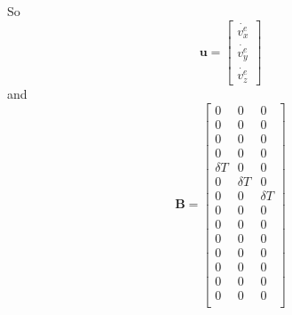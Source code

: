 \documentclass[a4paper]{report}
\numberwithin{equation}{chapter}
\newcommand{\mat}[1]{\boldsymbol{#1}}
\begin{document}
\bigskip

So
\begin{equation}
\mat{u} =
\begin{bmatrix}
\dot{v^e_x}\\
\dot{v^e_y}\\
\dot{v^e_z}
\end{bmatrix}
\end{equation}
and
\begin{equation}
\mat{B} =
\begin{bmatrix}
0 & 0 & 0\\
0 & 0 & 0\\
0 & 0 & 0\\
0 & 0 & 0\\
\delta T & 0 & 0\\
0 & \delta T & 0\\
0 & 0 & \delta T\\
0 & 0 & 0\\
0 & 0 & 0\\
0 & 0 & 0\\
0 & 0 & 0\\
0 & 0 & 0\\
0 & 0 & 0\\
0 & 0 & 0\\
\end{bmatrix}
\end{equation}

\bigskip
\end{document}
